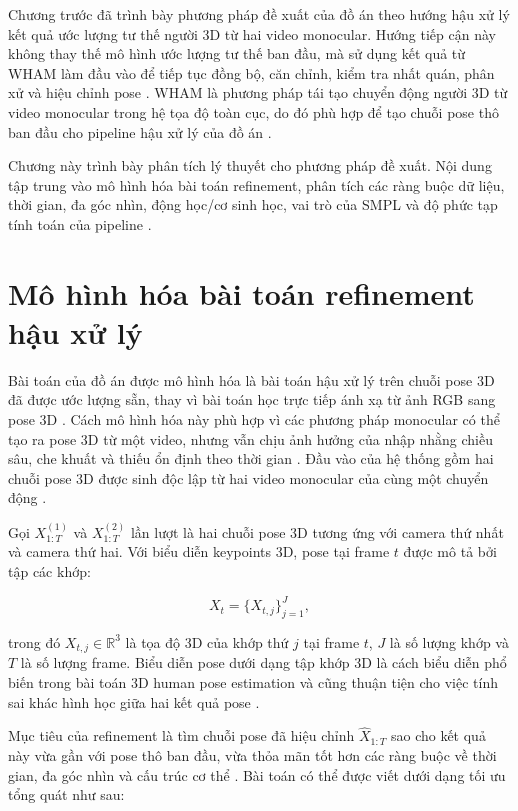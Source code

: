\documentclass[../DoAn.tex]{subfiles}
\begin{document}
Chương trước đã trình bày phương pháp đề xuất của đồ án theo hướng hậu xử lý kết quả ước lượng tư thế người 3D từ hai video monocular. Hướng tiếp cận này không thay thế mô hình ước lượng tư thế ban đầu, mà sử dụng kết quả từ WHAM làm đầu vào để tiếp tục đồng bộ, căn chỉnh, kiểm tra nhất quán, phân xử và hiệu chỉnh pose \cite{shin2024wham}. WHAM là phương pháp tái tạo chuyển động người 3D từ video monocular trong hệ tọa độ toàn cục, do đó phù hợp để tạo chuỗi pose thô ban đầu cho pipeline hậu xử lý của đồ án \cite{shin2024wham}.

Chương này trình bày phân tích lý thuyết cho phương pháp đề xuất. Nội dung tập trung vào mô hình hóa bài toán refinement, phân tích các ràng buộc dữ liệu, thời gian, đa góc nhìn, động học/cơ sinh học, vai trò của SMPL và độ phức tạp tính toán của pipeline \cite{smpl2015,smplify2016,physcap2020}.

\section{Mô hình hóa bài toán refinement hậu xử lý}

Bài toán của đồ án được mô hình hóa là bài toán hậu xử lý trên chuỗi pose 3D đã được ước lượng sẵn, thay vì bài toán học trực tiếp ánh xạ từ ảnh RGB sang pose 3D \cite{shin2024wham}. Cách mô hình hóa này phù hợp vì các phương pháp monocular có thể tạo ra pose 3D từ một video, nhưng vẫn chịu ảnh hưởng của nhập nhằng chiều sâu, che khuất và thiếu ổn định theo thời gian \cite{smplify2016,physcap2020}. Đầu vào của hệ thống gồm hai chuỗi pose 3D được sinh độc lập từ hai video monocular của cùng một chuyển động \cite{shin2024wham}.

Gọi $X^{(1)}_{1:T}$ và $X^{(2)}_{1:T}$ lần lượt là hai chuỗi pose 3D tương ứng với camera thứ nhất và camera thứ hai. Với biểu diễn keypoints 3D, pose tại frame $t$ được mô tả bởi tập các khớp:

\begin{equation}
X_t = \{X_{t,j}\}_{j=1}^{J},
\end{equation}

trong đó $X_{t,j} \in \mathbb{R}^{3}$ là tọa độ 3D của khớp thứ $j$ tại frame $t$, $J$ là số lượng khớp và $T$ là số lượng frame. Biểu diễn pose dưới dạng tập khớp 3D là cách biểu diễn phổ biến trong bài toán 3D human pose estimation và cũng thuận tiện cho việc tính sai khác hình học giữa hai kết quả pose \cite{probtriangulation2023,gu2024multiview}.

Mục tiêu của refinement là tìm chuỗi pose đã hiệu chỉnh $\hat{X}_{1:T}$ sao cho kết quả này vừa gần với pose thô ban đầu, vừa thỏa mãn tốt hơn các ràng buộc về thời gian, đa góc nhìn và cấu trúc cơ thể \cite{smplify2016,physcap2020}. Bài toán có thể được viết dưới dạng tối ưu tổng quát như sau:
\end{document}
